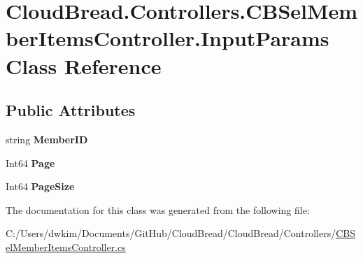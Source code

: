 \hypertarget{a00098}{}\section{Cloud\+Bread.\+Controllers.\+C\+B\+Sel\+Member\+Items\+Controller.\+Input\+Params Class Reference}
\label{a00098}
\subsection*{Public Attributes}
\begin{DoxyCompactItemize}
\item 
string {\bfseries Member\+ID}\hypertarget{a00098_a38b1ef707609faaa2ddc2fcdf3311ef8}{}\label{a00098_a38b1ef707609faaa2ddc2fcdf3311ef8}

\item 
Int64 {\bfseries Page}\hypertarget{a00098_a94ad166a7dc3fdd11ae7272f7536df3b}{}\label{a00098_a94ad166a7dc3fdd11ae7272f7536df3b}

\item 
Int64 {\bfseries Page\+Size}\hypertarget{a00098_a74aa66e4419f55454037db8a5d14b046}{}\label{a00098_a74aa66e4419f55454037db8a5d14b046}

\end{DoxyCompactItemize}


The documentation for this class was generated from the following file\+:\begin{DoxyCompactItemize}
\item 
C\+:/\+Users/dwkim/\+Documents/\+Git\+Hub/\+Cloud\+Bread/\+Cloud\+Bread/\+Controllers/\hyperlink{a00224}{C\+B\+Sel\+Member\+Items\+Controller.\+cs}\end{DoxyCompactItemize}
